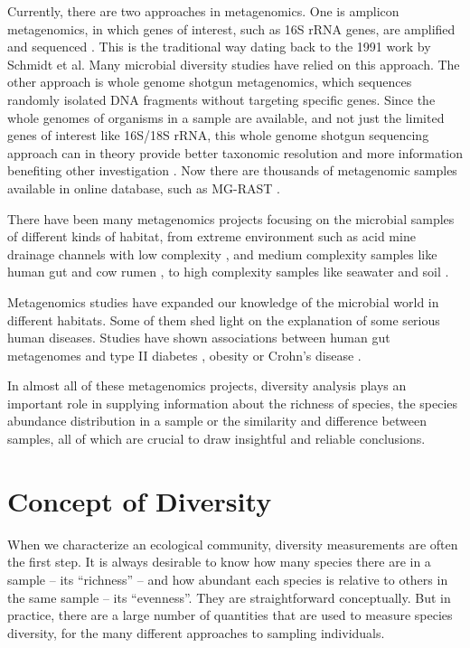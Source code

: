 Currently, there are two approaches in metagenomics. One is amplicon metagenomics, in which genes of interest, such as 
16S rRNA genes, are amplified and sequenced \cite{Sogin:2006aa}. This is the traditional way dating back to the 1991 work by Schmidt et al. Many microbial diversity studies have relied 
on this approach. The other approach is whole genome shotgun metagenomics, which sequences
randomly isolated DNA fragments without targeting specific genes. Since the whole genomes of organisms in a sample are available, and not just the limited
 genes of interest like 16S/18S rRNA, this whole genome shotgun sequencing approach can in theory provide better taxonomic resolution and
 more information benefiting other investigation \cite{Tyson:2004aa} \cite{Qin:2010aa}.  Now there are thousands of metagenomic samples available
in online database, such as MG-RAST \cite{Glass:2010aa}.
 
There have been many metagenomics projects focusing on the microbial samples of different kinds of 
habitat, from extreme environment such as acid mine drainage channels with low complexity \cite{Tyson:2004aa}, and medium complexity
 samples like human gut \cite{Qin:2010aa} and cow rumen \cite{Hess:2011aa}, to high complexity samples like seawater \cite{Venter:2004aa} and 
 soil \cite{Gilbert:2010aa}.
 
Metagenomics studies have expanded our knowledge of the microbial world in different habitats.
Some of them shed light on the explanation of some serious human diseases. Studies have shown associations between
human gut metagenomes and type II diabetes \cite{Qin:2012aa}, obesity \cite{Turnbaugh:2009aa, Kau:2011aa} or Crohn's disease \cite{Morgan:2012aa}. 

In almost all of these metagenomics projects, diversity analysis plays an important role in supplying information about the 
richness of species, the species abundance distribution in a sample or the similarity and difference between samples, 
all of which are crucial to draw insightful and reliable conclusions.




\section{Concept of Diversity}
When we characterize an ecological community, diversity measurements are often the first step.
It is always desirable to know how many species there are in a sample -- its ``richness'' -- and how abundant each
 species is relative to others in the same sample -- its ``evenness''. 
 They are straightforward conceptually. But in practice, there are a large number of quantities that are used
 to measure species diversity, for the many different approaches to sampling individuals. 

